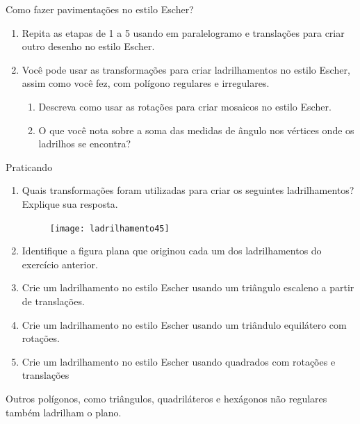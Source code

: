\begin{task}{Como fazer pavimentações no estilo Escher?}
\begin{enumerate}
\begin{figure}[H]
	\end{figure}

	\item Repita as etapas de 1 a 5 usando em paralelogramo e translações para criar outro desenho no estilo Escher.

	\item Você pode usar as transformações para criar ladrilhamentos no estilo Escher, assim como você fez, com polígono regulares e irregulares.
	\begin{enumerate}
		\item Descreva como usar as rotações para criar mosaicos no estilo Escher.
		\item O que você nota sobre a soma das medidas de ângulo nos vértices onde os ladrilhos se encontra?
	\end{enumerate}
\end{enumerate}
\end{task}

\begin{task}{Praticando}

	\begin{enumerate}
		\item Quais transformações foram utilizadas para criar os seguintes ladrilhamentos? Explique sua resposta.

	\begin{figure}[H]
	\centering
	\texttt{[image: ladrilhamento45]}

	\end{figure}
		\item Identifique a figura plana que originou cada um dos ladrilhamentos do exercício anterior.

		\item Crie um ladrilhamento no estilo Escher usando um triângulo escaleno a partir de translações.

		\item Crie um ladrilhamento no estilo Escher usando um triândulo equilátero com rotações.

		\item Crie um ladrilhamento no estilo Escher usando quadrados com rotações e translações
	\end{enumerate}


\end{task}





Outros polígonos, como triângulos, quadriláteros e hexágonos não regulares também ladrilham o plano.

